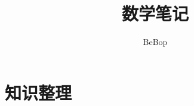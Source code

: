 \documentclass[12pt,a4paper]{book}
\begin{document}
    \title{数学笔记}
    \author{BeBop}
    \maketitle
    \newpage

    \tableofcontents
    \newpage
    
    \part{知识整理}




    
\end{document}
